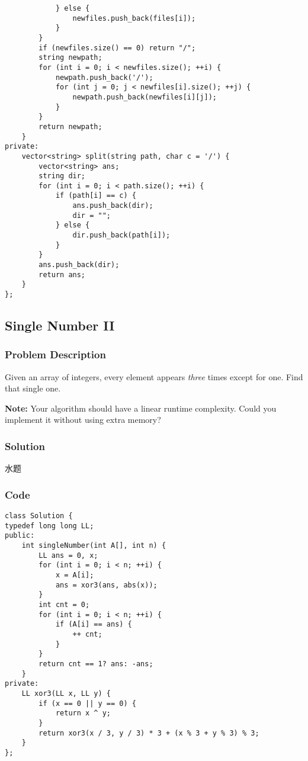 \documentclass[courier]{article}
\begin{document}
\begin{CJK*}{UTF8}{gkai}
\begin{lstlisting}
            } else {
                newfiles.push_back(files[i]);
            }
        }
        if (newfiles.size() == 0) return "/";
        string newpath;
        for (int i = 0; i < newfiles.size(); ++i) {
            newpath.push_back('/');
            for (int j = 0; j < newfiles[i].size(); ++j) {
                newpath.push_back(newfiles[i][j]);
            }
        }
        return newpath;
    }
private:
    vector<string> split(string path, char c = '/') {
        vector<string> ans;
        string dir;
        for (int i = 0; i < path.size(); ++i) {
            if (path[i] == c) {
                ans.push_back(dir);
                dir = "";
            } else {
                dir.push_back(path[i]);
            }
        }
        ans.push_back(dir);
        return ans;
    }
}; 
\end{lstlisting}


\subsection{ Single Number II }

\subsubsection*{Problem Description}
Given an array of integers, every element appears \emph{three} times except for one. Find that single one.

\textbf{Note:}
Your algorithm should have a linear runtime complexity. Could you implement it without using extra memory?



\subsubsection*{Solution}
水题

\subsubsection*{Code}
\begin{lstlisting}
class Solution {
typedef long long LL;
public:
    int singleNumber(int A[], int n) {
        LL ans = 0, x;
        for (int i = 0; i < n; ++i) {
            x = A[i];
            ans = xor3(ans, abs(x));
        }
        int cnt = 0;
        for (int i = 0; i < n; ++i) {
            if (A[i] == ans) {
                ++ cnt;
            }
        }
        return cnt == 1? ans: -ans;
    }
private:
    LL xor3(LL x, LL y) {
        if (x == 0 || y == 0) {
            return x ^ y;
        }
        return xor3(x / 3, y / 3) * 3 + (x % 3 + y % 3) % 3;
    }
}; 
\end{lstlisting}



\end{CJK*}
\end{document}
